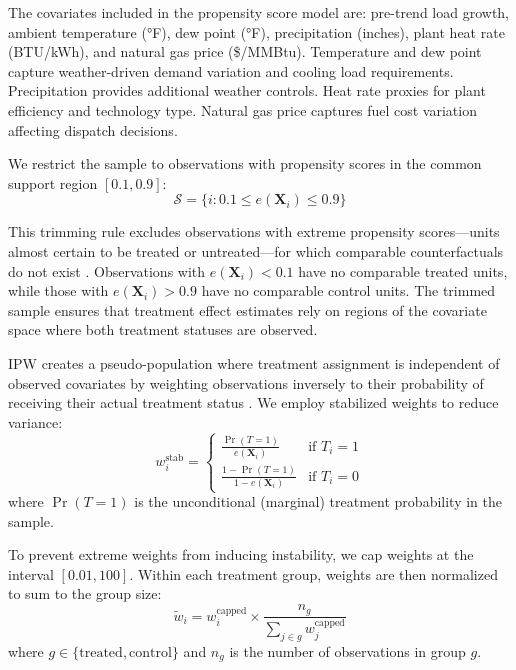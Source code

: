 \documentclass[a4paper,fleqn,longmktitle]{cas-sc}
\theoremstyle{plain}
\theoremstyle{definition}
\begin{document}
The covariates included in the propensity score model are: pre-trend load growth, ambient temperature (°F), dew point (°F), precipitation (inches), plant heat rate (BTU/kWh), and natural gas price (\$/MMBtu). Temperature and dew point capture weather-driven demand variation and cooling load requirements. Precipitation provides additional weather controls. Heat rate proxies for plant efficiency and technology type. Natural gas price captures fuel cost variation affecting dispatch decisions.

We restrict the sample to observations with propensity scores in the common support region $[0.1, 0.9]$:
\begin{equation}
    \mathcal{S} = \{i : 0.1 \leq e(\mathbf{X}_i) \leq 0.9\}
\end{equation}

This trimming rule excludes observations with extreme propensity scores---units almost certain to be treated or untreated---for which comparable counterfactuals do not exist \citep{crump2009dealing}. Observations with $e(\mathbf{X}_i) < 0.1$ have no comparable treated units, while those with $e(\mathbf{X}_i) > 0.9$ have no comparable control units. The trimmed sample ensures that treatment effect estimates rely on regions of the covariate space where both treatment statuses are observed.

IPW creates a pseudo-population where treatment assignment is independent of observed covariates by weighting observations inversely to their probability of receiving their actual treatment status \citep{hirano2003efficient}. We employ stabilized weights to reduce variance:
\begin{equation}
    w_i^{\text{stab}} = \begin{cases}
        \displaystyle\frac{\Pr(T=1)}{e(\mathbf{X}_i)} & \text{if } T_i = 1 \\[10pt]
        \displaystyle\frac{1 - \Pr(T=1)}{1 - e(\mathbf{X}_i)} & \text{if } T_i = 0
    \end{cases}
\end{equation}
where $\Pr(T=1)$ is the unconditional (marginal) treatment probability in the sample.

To prevent extreme weights from inducing instability, we cap weights at the interval $[0.01, 100]$. Within each treatment group, weights are then normalized to sum to the group size:
\begin{equation}
    \tilde{w}_i = w_i^{\text{capped}} \times \frac{n_g}{\sum_{j \in g} w_j^{\text{capped}}}
\end{equation}
where $g \in \{\text{treated}, \text{control}\}$ and $n_g$ is the number of observations in group $g$.
\end{document}
